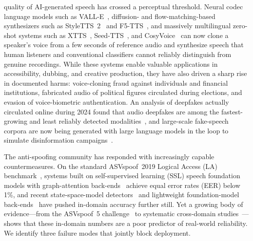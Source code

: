 
 quality of AI-generated speech has crossed a perceptual
threshold. Neural codec language models such as VALL-E~\cite{wang2023valle},
diffusion- and flow-matching-based synthesizers such as StyleTTS~2~\cite{li2023styletts2}
and F5-TTS~\cite{chen2024f5tts}, and massively multilingual zero-shot systems such as
XTTS~\cite{casanova2024xtts}, Seed-TTS~\cite{anastassiou2024seedtts}, and
CosyVoice~\cite{du2024cosyvoice} can now clone a speaker's voice from a few seconds of
reference audio and synthesize speech that human listeners and conventional classifiers
cannot reliably distinguish from genuine recordings. While these systems enable valuable
applications in accessibility, dubbing, and creative production, they have also driven a
sharp rise in documented harms: voice-cloning fraud against individuals and financial
institutions, fabricated audio of political figures circulated during elections, and
evasion of voice-biometric authentication. An analysis of deepfakes actually circulated
online during 2024 found that audio deepfakes are among the fastest-growing and least
reliably detected modalities~\cite{chandra2025deepfakeeval}, and large-scale fake-speech
corpora are now being generated with large language models in the loop to simulate
disinformation campaigns~\cite{luong2024llamapartialspoof}.

The anti-spoofing community has responded with increasingly capable countermeasures.
On the standard ASVspoof~2019 Logical Access (LA) benchmark~\cite{wang2020asvspoof2019},
systems built on self-supervised learning (SSL) speech foundation models with
graph-attention back-ends~\cite{tak2022automatic,jung2022aasist} achieve equal error
rates (EER) below 1\%, and recent state-space-model
detectors~\cite{xiao2025xlsrmamba,chen2024rawbmamba} and lightweight foundation-model
back-ends~\cite{liu2025nes2net} have pushed in-domain accuracy further still. Yet a
growing body of evidence---from the ASVspoof~5 challenge~\cite{wang2024asvspoof5,
wang2025asvspoof5journal} to systematic cross-domain
studies~\cite{muller2022inthewild,muller2024harder}---shows that these in-domain numbers
are a poor predictor of real-world reliability. We identify three failure modes that
jointly block deployment.

